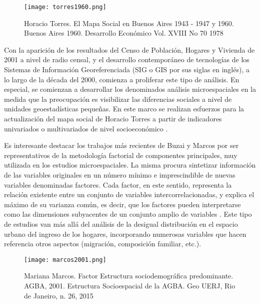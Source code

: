 \begin{figure}[t]
	\begin{center}
		\texttt{[image: torres1960.png]}
		\caption{Horacio Torres. El Mapa Social en Buenos Aires 1943 - 1947 y 1960. Buenos Aires 1960. Desarrollo Económico Vol. XVIII No 70 1978}
	\end{center}
\end{figure}


Con la aparición de los resultados del Censo de Población, Hogares y Vivienda de 2001 a nivel de radio censal, y el desarrollo contemporáneo de tecnologías de los Sistemas de Información Georeferenciada (SIG o GIS por sus siglas en inglés), a lo largo de la década del 2000, comienza a proliferar este tipo de análisis. En especial, se comienzan a desarrollar los denominados análisis microespaciales en la medida que la preocupación es visibilizar las diferencias sociales a nivel de unidades geoestadísticas pequeñas. En este marco se realizan esfuerzos para la  actualización del mapa social de Horacio Torres a partir de indicadores univariados o multivariados de nivel socioeconómico \cite{thuiller,groisman,marcos2011,marcos2015,buzaimarcos2014,abba}.

Es interesante destacar los trabajos más recientes de Buzai y Marcos \cite{buzaimarcos2014,marcos2015} por ser representativos de la metodología factorial de componentes principales, muy utilizada en los estudios microespaciales. La misma procura sintetizar información de las variables originales en un número mínimo e imprescindible de nuevas variables denominadas factores. Cada factor, en este sentido, representa la relación existente entre un conjunto de variables intercorrelacionadas, y explica el máximo de su varianza común, es decir, que los factores pueden interpretarse como las dimensiones subyacentes de un conjunto amplio de variables \cite{marcos2015}. Este tipo de estudios van más allá del análisis de la desigual distribución en el espacio urbano del ingreso de los hogares, incorporando numerosas variables que hacen referencia otros aspectos (migración, composición familiar, etc.).

\begin{figure}[t]
	\begin{center}
		\texttt{[image: marcos2001.png]}
		\caption{Mariana Marcos. Factor Estructura sociodemográfica predominante. AGBA, 2001. Estructura Socioespacial de la AGBA. Geo UERJ, Rio de Janeiro, n. 26, 2015}
	\end{center}
\end{figure}


